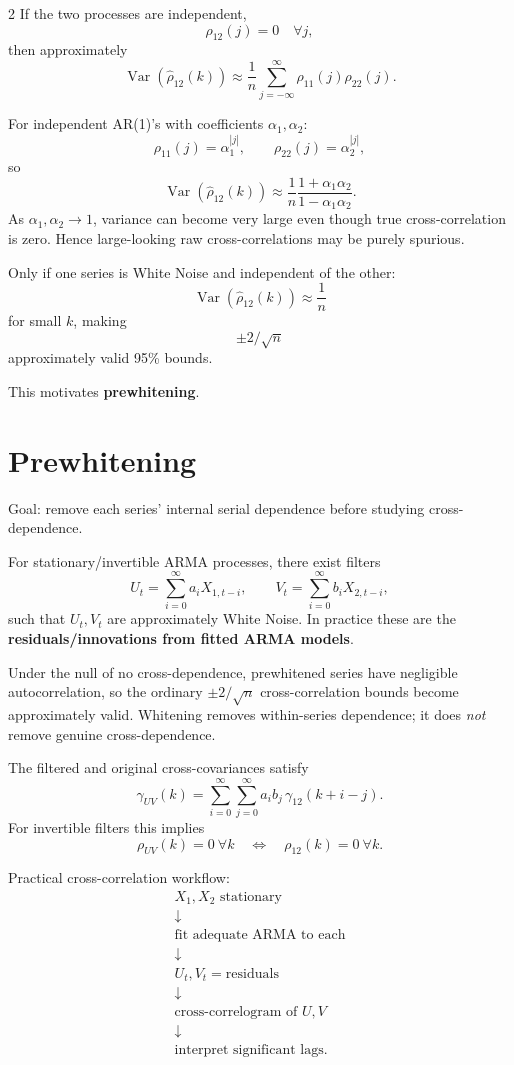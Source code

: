 \documentclass[9pt,a4paper]{extarticle}
\newcommand{\key}[1]{\textbf{#1}}
\begin{document}
\begin{multicols}{2}
If the two processes are independent,
\[
\rho_{12}(j)=0\quad\forall j,
\]
then approximately
\[
\boxed{
\operatorname{Var}(\widehat\rho_{12}(k))
\approx
\frac1n
\sum_{j=-\infty}^{\infty}
\rho_{11}(j)\rho_{22}(j).
}
\]

For independent AR(1)'s with coefficients \(\alpha_1,\alpha_2\):
\[
\rho_{11}(j)=\alpha_1^{|j|},
\qquad
\rho_{22}(j)=\alpha_2^{|j|},
\]
so
\[
\boxed{
\operatorname{Var}(\widehat\rho_{12}(k))
\approx
\frac1n
\frac{1+\alpha_1\alpha_2}
{1-\alpha_1\alpha_2}.
}
\]
As \(\alpha_1,\alpha_2\to1\), variance can become very large even though true cross-correlation is zero. Hence large-looking raw cross-correlations may be purely spurious.

Only if one series is White Noise and independent of the other:
\[
\boxed{
\operatorname{Var}(\widehat\rho_{12}(k))
\approx\frac1n
}
\]
for small \(k\), making
\[
\boxed{\pm2/\sqrt n}
\]
approximately valid 95\% bounds.

This motivates \key{prewhitening}.

\section{Prewhitening}

Goal: remove each series' internal serial dependence before studying cross-dependence.

For stationary/invertible ARMA processes, there exist filters
\[
U_t=\sum_{i=0}^{\infty}a_iX_{1,t-i},
\qquad
V_t=\sum_{i=0}^{\infty}b_iX_{2,t-i},
\]
such that \(U_t,V_t\) are approximately White Noise. In practice these are the \key{residuals/innovations from fitted ARMA models}.

Under the null of no cross-dependence, prewhitened series have negligible autocorrelation, so the ordinary \(\pm2/\sqrt n\) cross-correlation bounds become approximately valid. Whitening removes within-series dependence; it does \emph{not} remove genuine cross-dependence.

The filtered and original cross-covariances satisfy
\[
\gamma_{UV}(k)=\sum_{i=0}^{\infty}\sum_{j=0}^{\infty}a_i b_j\,
\gamma_{12}(k+i-j).
\]
For invertible filters this implies
\[
\boxed{\rho_{UV}(k)=0\ \forall k\quad\Longleftrightarrow\quad
\rho_{12}(k)=0\ \forall k.}
\]

Practical cross-correlation workflow:
\[
\boxed{
\begin{array}{c}
X_1,X_2\text{ stationary}\\
\downarrow\\
\text{fit adequate ARMA to each}\\
\downarrow\\
U_t,V_t=\text{residuals}\\
\downarrow\\
\text{cross-correlogram of }U,V\\
\downarrow\\
\text{interpret significant lags}.
\end{array}}
\]


\end{multicols}
\end{document}
